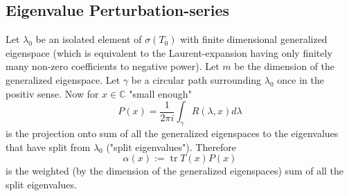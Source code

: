 \documentclass[11pt]{article}
\DeclareMathOperator{\tr}{tr}
\begin{document}
\subsection{Eigenvalue Perturbation-series}
Let $\lambda_0$ be an isolated element of $\sigma (T_0)$ with finite dimensional
generalized eigenspace (which is equivalent to the Laurent-expansion having only finitely many non-zero coefficients to negative power).
Let $m$ be the dimension of the generalized eigenspace.
Let $ \gamma$ be a circular path surrounding $\lambda_0$ once in the positiv sense.
Now for $x \in \mathbb{C}$ "small enough"
\begin{equation}
    P(x) = \frac{1}{2\pi i} \int_\gamma  R(\lambda,x) d \lambda
\end{equation}
is the projection onto sum of all the generalized eigenspaces to the eigenvalues
that have split from $\lambda_0$ ("split eigenvalues").
Therefore 
\begin{equation}
   \alpha (x) := \tr T(x) P(x) 
\end{equation}
is the weighted (by the dimension of the generalized eigenspaces) sum of all
the split eigenvalues.
\end{document}
